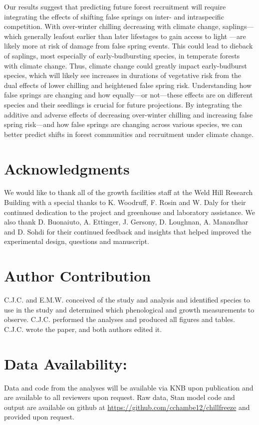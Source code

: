\documentclass{article}\usepackage[]{graphicx}\usepackage[]{color}
\begin{document}
Our results suggest that predicting future forest recruitment will require integrating the effects of shifting false springs on inter- and intraspecific competition. With over-winter chilling decreasing with climate change, saplings---which generally leafout earlier than later lifestages to gain access to light \citep{Augspurger2009}---are likely more at risk of damage from false spring events. This could lead to dieback of saplings, most especially of early-budbursting species, in temperate forests with climate change. Thus, climate change could greatly impact early-budburst species, which will likely see increases in durations of vegetative risk from the dual effects of lower chilling and heightened false spring risk. Understanding how false springs are changing and how equally---or not---these effects are on different species and their seedlings is crucial for future projections. By integrating the additive and adverse effects of decreasing over-winter chilling and increasing false spring risk---and how false springs are changing across various species, we can better predict shifts in forest communities and recruitment under climate change. 

\section*{Acknowledgments}
We would like to thank all of the growth facilities staff at the Weld Hill Research Building with a special thanks to K. Woodruff, F. Rosin and W. Daly for their continued dedication to the project and greenhouse and laboratory assistance. We also thank D. Buonaiuto, A. Ettinger, J. Gersony, D. Loughnan, A. Manandhar and D. Sohdi for their continued feedback and insights that helped improved the experimental design, questions and manuscript.

\section*{Author Contribution} 
C.J.C. and E.M.W. conceived of the study and analysis and identified species to use in the study and determined which phenological and growth measurements to observe. C.J.C. performed the analyses and produced all figures and tables. C.J.C. wrote the paper, and both authors edited it.

\section*{Data Availability:}
Data and code from the analyses will be available via KNB upon publication and are available to all reviewers upon request. Raw data, {Stan} model code and output are available on github at \url{https://github.com/cchambe12/chillfreeze} and provided upon request.
\end{document}
